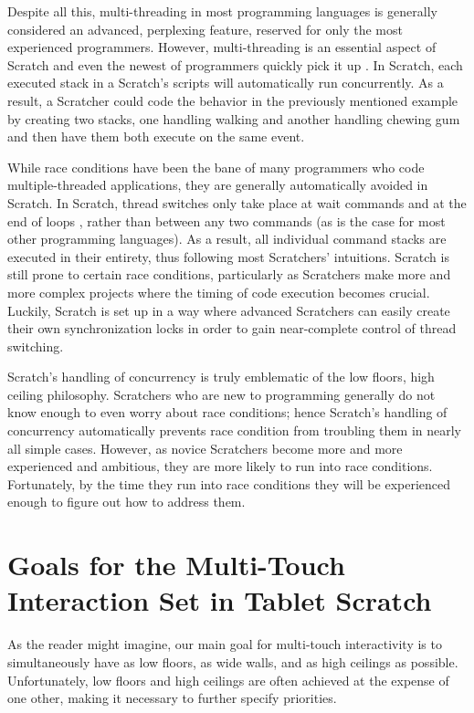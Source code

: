 Despite all this, multi-threading in most programming languages is generally considered an advanced, perplexing feature, reserved for only the most experienced programmers. However, multi-threading is an essential aspect of Scratch and even the newest of programmers quickly pick it up \cite{Maloney}. In Scratch, each executed stack in a Scratch's scripts will automatically run concurrently. As a result, a Scratcher could code the behavior in the previously mentioned example by creating two stacks, one handling walking and another handling chewing gum and then have them both execute on the same event.

While race conditions have been the bane of many programmers who code multiple-threaded applications, they are generally automatically avoided in Scratch. In Scratch, thread switches only take place at wait commands and at the end of loops \cite{Maloney}, rather than between any two commands (as is the case for most other programming languages). As a result, all individual command stacks are executed in their entirety, thus following most Scratchers' intuitions. Scratch is still prone to certain race conditions, particularly as Scratchers make more and more complex projects where the timing of code execution becomes crucial. Luckily, Scratch is set up in a way where advanced Scratchers can easily create their own synchronization locks in order to gain near-complete control of thread switching.

Scratch's handling of concurrency is truly emblematic of the low floors, high ceiling philosophy. Scratchers who are new to programming generally do not know enough to even worry about race conditions; hence Scratch's handling of concurrency automatically prevents race condition from troubling them in nearly all simple cases. However, as  novice Scratchers become more and more experienced and ambitious, they are more likely to run into race conditions. Fortunately, by the time they run into race conditions they will be experienced enough to figure out how to address them.

\section{Goals for the Multi-Touch Interaction Set in Tablet Scratch}
As the reader might imagine, our main goal for multi-touch interactivity is to simultaneously have as low floors, as wide walls, and as high ceilings as possible. Unfortunately, low floors and high ceilings are often achieved at the expense of one other, making it necessary to further specify priorities. 

